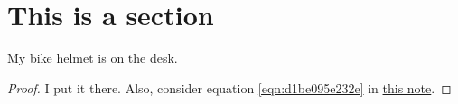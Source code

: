 \documentclass[reqno]{amsart} 
\begin{document}
\section{This is a section}
\begin{theorem}
My bike helmet is on the desk.
\end{theorem}
\begin{proof}
I put it there.  Also, consider equation \eqref{eqn:d1be095e232e} in \href{20230614T131127__rings-of-differential-operators-blue-book-on-the-desk.pdf}{this note}.
\end{proof}


{} 
\end{document}
